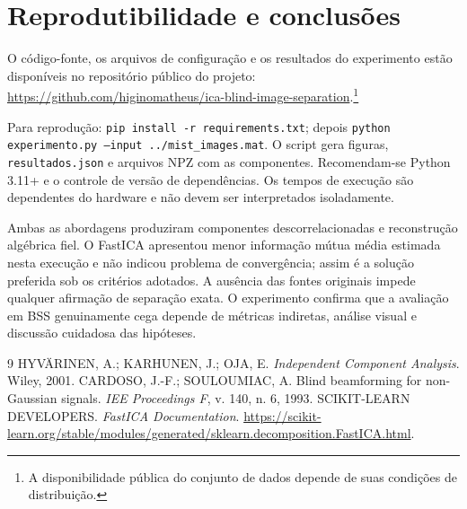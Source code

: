 \documentclass[12pt,a4paper]{article}
\begin{document}
\section{Reprodutibilidade e conclusões}
O código-fonte, os arquivos de configuração e os resultados do experimento estão disponíveis no repositório público do projeto: \url{https://github.com/higinomatheus/ica-blind-image-separation}.\footnote{A disponibilidade pública do conjunto de dados depende de suas condições de distribuição.}

Para reprodução: \texttt{pip install -r requirements.txt}; depois \texttt{python experimento.py --input ../mist\_images.mat}. O script gera figuras, \texttt{resultados.json} e arquivos NPZ com as componentes. Recomendam-se Python 3.11+ e o controle de versão de dependências. Os tempos de execução são dependentes do hardware e não devem ser interpretados isoladamente.

Ambas as abordagens produziram componentes descorrelacionadas e reconstrução algébrica fiel. O FastICA apresentou menor informação mútua média estimada nesta execução e não indicou problema de convergência; assim é a solução preferida sob os critérios adotados. A ausência das fontes originais impede qualquer afirmação de separação exata. O experimento confirma que a avaliação em BSS genuinamente cega depende de métricas indiretas, análise visual e discussão cuidadosa das hipóteses.

\begin{thebibliography}{9}
 HYVÄRINEN, A.; KARHUNEN, J.; OJA, E. \textit{Independent Component Analysis}. Wiley, 2001.
 CARDOSO, J.-F.; SOULOUMIAC, A. Blind beamforming for non-Gaussian signals. \textit{IEE Proceedings F}, v. 140, n. 6, 1993.
 SCIKIT-LEARN DEVELOPERS. \textit{FastICA Documentation}. \url{https://scikit-learn.org/stable/modules/generated/sklearn.decomposition.FastICA.html}.
\end{thebibliography}
\end{document}
